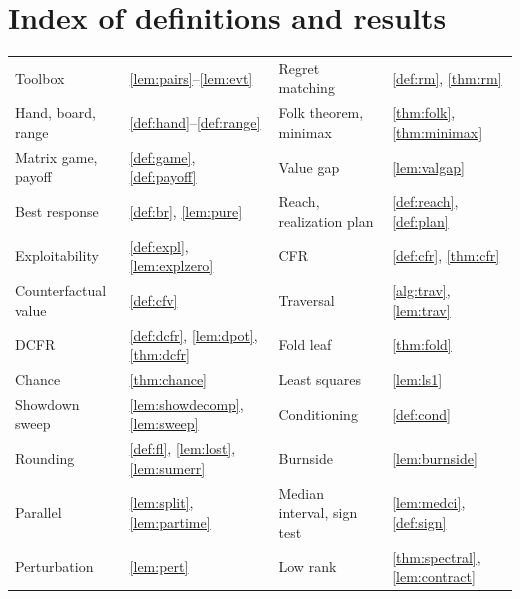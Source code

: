 \documentclass[11pt]{article}
\theoremstyle{definition}
\begin{document}
\section{Index of definitions and results}
\small
\begin{tabular}{@{}ll@{\qquad}ll@{}}
Toolbox & \ref{lem:pairs}--\ref{lem:evt} & Regret matching & \ref{def:rm}, \ref{thm:rm}\\
Hand, board, range & \ref{def:hand}--\ref{def:range} & Folk theorem, minimax & \ref{thm:folk}, \ref{thm:minimax}\\
Matrix game, payoff & \ref{def:game}, \ref{def:payoff} & Value gap & \ref{lem:valgap}\\
Best response & \ref{def:br}, \ref{lem:pure} & Reach, realization plan & \ref{def:reach}, \ref{def:plan}\\
Exploitability & \ref{def:expl}, \ref{lem:explzero} & CFR & \ref{def:cfr}, \ref{thm:cfr}\\
Counterfactual value & \ref{def:cfv} & Traversal & \ref{alg:trav}, \ref{lem:trav}\\
DCFR & \ref{def:dcfr}, \ref{lem:dpot}, \ref{thm:dcfr} & Fold leaf & \ref{thm:fold}\\
Chance & \ref{thm:chance} & Least squares & \ref{lem:ls1}\\
Showdown sweep & \ref{lem:showdecomp}, \ref{lem:sweep} & Conditioning & \ref{def:cond}\\
Rounding & \ref{def:fl}, \ref{lem:lost}, \ref{lem:sumerr} & Burnside & \ref{lem:burnside}\\
Parallel & \ref{lem:split}, \ref{lem:partime} & Median interval, sign test & \ref{lem:medci}, \ref{def:sign}\\
Perturbation & \ref{lem:pert} & Low rank & \ref{thm:spectral}, \ref{lem:contract}\\
\end{tabular}
\normalsize

\end{document}
